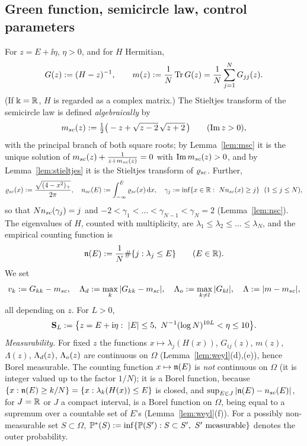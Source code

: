 \subsection{Green function, semicircle law, control parameters}\label{sec:green}
For $z=E+\ii\eta$, $\eta>0$, and for $H$ Hermitian,
\begin{equation}\label{eq:green}
 G(z):=(H-z)^{-1},\qquad m(z):=\frac1N\operatorname{Tr} G(z)=\frac1N\sum_{j=1}^NG_{jj}(z).
\end{equation}
(If $\Bbbk=\mathbb{R}$, $H$ is regarded as a complex matrix.) The Stieltjes transform of the semicircle law is defined \emph{algebraically} by
\begin{equation}\label{eq:defmsc}
 m_{sc}(z):=\tfrac12\big(-z+\sqrt{z-2}\,\sqrt{z+2}\,\big)\qquad(\operatorname{Im} z>0),
\end{equation}
with the principal branch of both square roots; by Lemma~\ref{lem:msc} it is the unique solution of
$m_{sc}(z)+\frac1{z+m_{sc}(z)}=0$ with $\operatorname{Im}m_{sc}(z)>0$, and by Lemma~\ref{lem:stieltjes} it is the Stieltjes transform of $\varrho_{sc}$. Further,
\begin{equation}\label{eq:sc}
 \varrho_{sc}(x):=\frac{\sqrt{(4-x^2)_+}}{2\pi},\quad n_{sc}(E):=\int_{-\infty}^E\varrho_{sc}(x)\,\mathrm{d} x,\quad
 \gamma_j:=\inf\{x\in\mathbb{R}:\ Nn_{sc}(x)\ge j\}\ \ (1\le j\le N),
\end{equation}
so that $Nn_{sc}(\gamma_j)=j$ and $-2<\gamma_1<\dots<\gamma_{N-1}<\gamma_N=2$ (Lemma~\ref{lem:nsc}). The eigenvalues of $H$, counted with multiplicity, are
$\lambda_1\le\lambda_2\le\dots\le\lambda_N$, and the empirical counting function is
\[
 \mathfrak{n}(E):=\frac1N\#\{j:\lambda_j\le E\}\qquad(E\in\mathbb{R}).
\]
We set
\begin{equation}\label{eq:defLambda}
 v_k:=G_{kk}-m_{sc},\quad \Lambda_d:=\max_k|G_{kk}-m_{sc}|,\quad \Lambda_o:=\max_{k\ne l}|G_{kl}|,\quad \Lambda:=|m-m_{sc}|,
\end{equation}
all depending on $z$. For $L>0$,
\begin{equation}\label{eq:defS}
 \mathbf{S}_L:=\big\{z=E+\mathrm{i}\eta:\ |E|\le5,\ N^{-1}(\log N)^{10L}<\eta\le10\big\}.
\end{equation}
\emph{Measurability.} For fixed $z$ the functions $x\mapsto\lambda_j(H(x))$, $G_{ij}(z)$, $m(z)$, $\Lambda(z)$, $\Lambda_d(z)$, $\Lambda_o(z)$ are continuous on $\Omega$
(Lemma~\ref{lem:weyl}(d),(e)), hence Borel measurable. The counting function $x\mapsto\mathfrak{n}(E)$ is \emph{not} continuous on $\Omega$ (it is integer valued up to the factor $1/N$);
it is a Borel function, because $\{x:\mathfrak{n}(E)\ge k/N\}=\{x:\lambda_k(H(x))\le E\}$ is closed, and $\sup_{E\in J}|\mathfrak{n}(E)-n_{sc}(E)|$, for $J=\mathbb{R}$ or $J$ a compact interval,
is a Borel function on $\Omega$, being equal to a supremum over a countable set of $E$'s (Lemma~\ref{lem:weyl}(f)).
For a possibly non-measurable set $S\subset\Omega$, $\PP^*(S):=\inf\{\PP(S'):S\subset S',\ S'\text{ measurable}\}$ denotes the outer probability.

